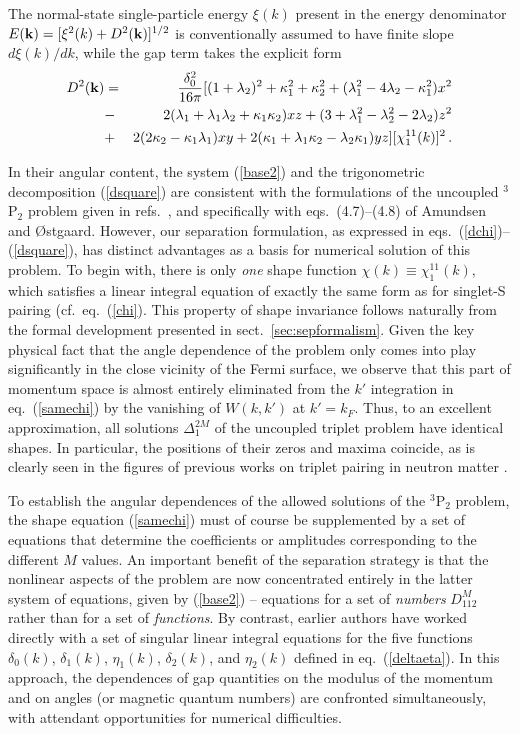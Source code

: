 The normal-state single-particle energy $\xi(k)$ present in the
energy denominator $E({\bf k})=[\xi^2(k)+D^2({\bf k})]^{1/2}$
is conventionally assumed to have finite slope $d\xi(k)/dk$, while
the gap term takes the explicit form
\begin{eqnarray}
D^2({\bf k})
&=& {{\delta_0^2}\over{16 \pi}}[(1+\lambda_2)^2+\kappa^2_1 +\kappa^2_2
     +(\lambda_1^2-4\lambda_2-\kappa^2_1)x^2 \nonumber\\
&-& 2(\lambda_1+ \lambda_1\lambda_2+\kappa_1\kappa_2) xz 
    +(3+\lambda^2_1-\lambda^2_2-2\lambda_2)z^2\nonumber\\
&+& 2(2\kappa_2-\kappa_1\lambda_1)xy
    +2(\kappa_1+ \lambda_1\kappa_2-\lambda_2\kappa_1)yz]
    [\chi_1^{11}(k)]^2 \, .
    \label{dsquare} 
\end{eqnarray}

In their angular content, the system (\ref{base2}) and the trigonometric
decomposition (\ref{dsquare}) are consistent with the formulations 
of the uncoupled $^3$P$_2$ problem given in refs.~\cite{ttr,tt71,ostgaard}, 
and specifically with eqs.~(4.7)--(4.8) of Amundsen and {\O}stgaard.
However, our separation formulation, as expressed in 
eqs.~(\ref{dchi})--(\ref{dsquare}),
has distinct advantages as a basis for numerical solution of this
problem.  To begin with, there is only {\it one} shape function
$\chi(k) \equiv\chi^{11}_1(k)$, which satisfies a linear integral
equation of exactly the same form as for singlet-S pairing
(cf.\ eq.~(\ref{chi}).  This property of shape invariance follows
naturally from the formal development presented in 
sect.~\ref{sec:sepformalism}.  Given the key physical fact that the
angle dependence of the problem only comes into play significantly in
the close vicinity of the Fermi surface, we observe that this part
of momentum space is almost entirely eliminated from the $k'$ integration
in eq.~(\ref{samechi}) by the vanishing of $W(k,k')$ at
$k'=k_F$.  Thus, to an excellent approximation, all solutions
$\Delta_1^{2M}$ of the uncoupled triplet problem have identical
shapes.  In particular, the positions of their zeros and maxima
coincide, as is clearly seen in the figures of previous works on
triplet pairing in neutron matter \cite{ttr,ostgaard}.

To establish the angular dependences of the allowed solutions of
the $^3$P$_2$ problem, the shape equation (\ref{samechi}) must of course
be supplemented by a set of equations that determine the coefficients or
amplitudes corresponding to the different $M$ values.  An important
benefit of the separation strategy is that the nonlinear aspects of
the problem are now concentrated entirely in the latter system of
equations, given by (\ref{base2}) --  equations for a set of
{\it numbers} $D_{112}^M$ rather than for a set of {\it functions}.
By contrast, earlier authors \cite{tt71,ttr,ostgaard} have worked directly
with a set of singular linear integral equations for the five functions
$\delta_0(k)$, $\delta_1(k)$, $\eta_1(k)$, $\delta_2(k)$, and $\eta_2(k)$
defined in eq.~(\ref{deltaeta}).  In this approach, the dependences of
gap quantities on the modulus of the momentum and on angles (or magnetic
quantum numbers) are confronted simultaneously, with attendant
opportunities for numerical difficulties.

